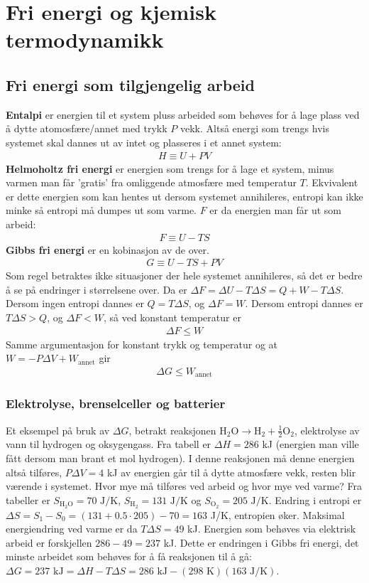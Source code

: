 \documentclass[12pt]{article}
\begin{document}
\section{Fri energi og kjemisk termodynamikk}
\subsection{Fri energi som tilgjengelig arbeid}
\textbf{Entalpi} er energien til et system pluss arbeided som behøves for å lage plass ved å dytte
atomosfære/annet med trykk $P$ vekk. Altså energi som trengs hvis systemet
skal dannes ut av intet og plasseres i et annet system:
\begin{align*}
  H \equiv U + PV
\end{align*}
\textbf{Helmoholtz fri energi} er energien som trengs for å lage et system, minus
varmen man får 'gratis' fra omliggende atmosfære med temperatur $T$. Ekvivalent er
dette energien som kan hentes ut dersom systemet annihileres, entropi kan ikke minke
så entropi må dumpes ut som varme. $F$ er da energien man får ut som arbeid:
\begin{align*}
  F \equiv U - TS
\end{align*}
\textbf{Gibbs fri energi} er en kobinasjon av de over.
\begin{align*}
  G \equiv U - TS + PV
\end{align*}
Som regel betraktes ikke situasjoner der hele systemet annihileres, så det er
bedre å se på endringer i størrelsene over. Da er $\Delta F = \Delta U - T \Delta S = Q + W - T \Delta S$.
Dersom ingen entropi dannes er $Q = T\Delta S$, og $\Delta F = W$. Dersom entropi
dannes er $T\Delta S > Q$, og $\Delta F < W$, så ved konstant temperatur er
\begin{align*}
  \Delta F \leq W
\end{align*}
Samme argumentasjon for konstant trykk og temperatur og at $W = -P\Delta V + W_\text{annet}$
gir
\begin{align*}
  \Delta G \leq W_\text{annet}
\end{align*}
\subsubsection{Elektrolyse, brenselceller og batterier}
Et eksempel på bruk av $\Delta G$, betrakt reaksjonen $\text{H}_2 \text{O} \rightarrow \text{H}_2 + \frac{1}{2}\text{O}_2$,
elektrolyse av vann til hydrogen og oksygengass. Fra tabell er $\Delta H = 286$ kJ (energien man ville fått dersom man brant et mol hydrogen).
I denne reaksjonen må denne energien altså tilføres, $P\Delta V = 4$ kJ av energien går til å dytte atmosfære vekk, resten blir værende i systemet.
Hvor mye må tilføres ved arbeid og hvor mye ved varme? Fra tabeller er $S_{\text{H}_2 \text{O}} = 70 \text{ J/K}$, $S_{\text{H}_2} = 131 \text{ J/K}$
og $S_{\text{O}_2} = 205 \text{ J/K}$. Endring i entropi er $\Delta S = S_1 - S_0 = (131 + 0.5 \cdot 205) - 70 = 163$ J/K, entropien øker. Maksimal
energiendring ved varme er da $T\Delta S = 49$ kJ. Energien som behøves via elektrisk arbeid
er forskjellen $286 - 49 = 237$ kJ. Dette er endringen i Gibbs fri energi, det minste arbeidet som behøves for
å få reaksjonen til å gå: $\Delta G = 237 \text{ kJ} = \Delta H - T \Delta S = 286 \text{ kJ} - (298 \text{ K})(163 \text{ J/K})$.
\end{document}
